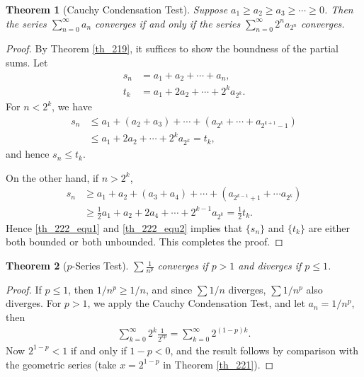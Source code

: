 \documentclass[11pt]{book}
\newtheorem{theorem}{Theorem}[chapter]
\theoremstyle{definition}
\numberwithin{equation}{chapter}
\begin{document}
\begin{theorem}[Cauchy Condensation Test]\label{th_222}
Suppose $a_1 \geq a_2 \geq a_3 \geq \cdots \geq 0$. Then the series $\sum^\infty_{n=0} a_n$ converges if and only if the series $\sum^\infty_{n=0} 2^n a_{2^n}$ converges.
\end{theorem}
\begin{proof}
By Theorem \ref{th_219}, it suffices to show the boundness of the partial sums. Let
\begin{align*}
    s_n & = a_1 + a_2 + \cdots + a_n, \\
    t_k & = a_1 + 2a_2 + \cdots + 2^k a_{2^k}.
\end{align*}
For $n < 2^k$, we have
\begin{align}\label{th_222_equ1}
    s_n & \leq a_1 + (a_2 + a_3) + \cdots + (a_{2^k} + \cdots + a_{2^{k+1}-1}) \\
    & \leq a_1 + 2a_2 + \cdots + 2^k a_{2^k} = t_k,
\end{align}
and hence $s_n \leq t_k$. 

On the other hand, if $n > 2^k$,
\begin{align}\label{th_222_equ2}
    s_n & \geq a_1 + a_2 + (a_3 + a_4) + \cdots + (a_{2^{k-1}+1} + \cdots a_{2^k}) \\
    & \geq \frac{1}{2}a_1 + a_2 + 2 a_4 + \cdots + 2^{k-1} a_{2^k} = \frac{1}{2} t_k.
\end{align}
Hence \eqref{th_222_equ1} and \eqref{th_222_equ2} implies that $\{s_n\}$ and $\{t_k\}$ are either both bounded or both unbounded. This completes the proof.
\end{proof}

\medskip

\begin{theorem}[$p$-Series Test]\label{th_223}
$\displaystyle \sum \frac{1}{n^p}$ converges if $p > 1$ and diverges if $p \leq 1$.
\end{theorem}
\begin{proof}
If $p \leq 1$, then $1/n^p \geq 1/n$, and since $\sum 1/n$ diverges, $\sum 1/n^p$ also diverges. For $p > 1$, we apply the Cauchy Condensation Test, and let $a_n = 1/n^p$, then
\begin{align*}
    \sum^\infty_{k=0} 2^k \frac{1}{2^{kp}} = \sum^\infty_{k=0} 2^{(1-p)k}.
\end{align*}
Now $2^{1-p} < 1$ if and only if $1 - p < 0$, and the result follows by comparison with the geometric series (take $x = 2^{1-p}$ in Theorem \ref{th_221}).
\end{proof}
\end{document}

